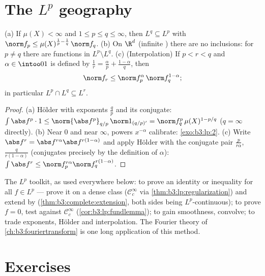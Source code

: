 \section{The \texorpdfstring{$L^p$}{Lp} geography}

\begin{proposition}\label{prop:b3:lp:inclusions}
(a) If $\mu(X) < \infty$ and $1 \leq p \leq q \leq \infty$,
then $L^q \subseteq L^p$ with $\norm f_p \leq
\mu(X)^{\frac1p - \frac1q}\,\norm f_q$.
(b) On $\R^d$ (infinite ) there are no inclusions:
for $p \neq q$ there are functions in $L^p\setminus L^q$.
(c) (Interpolation) If $p < r < q$ and $\alpha \in \intoo01$
is defined by $\frac1r = \frac\alpha p + \frac{1 - \alpha}q$,
then
\[
\norm f_r \leq \norm f_p^{\alpha}\,\norm f_q^{1 - \alpha} ;
\]
in particular $L^p \cap L^q \subseteq L^r$.
\end{proposition}

\begin{proof}
(a) H\"older with exponents $\frac qp$ and its conjugate:
$\int\abs f^p\cdot 1 \leq \norm{\abs f^p}_{q/p}\,\norm
1_{(q/p)'} = \norm f_q^p\,\mu(X)^{1 - p/q}$ ($q = \infty$
directly). (b) Near $0$ and near $\infty$, powers $x^{-\alpha}$
calibrate: \cref{exo:b3:lp:2}. (c) Write $\abs f^r = \abs
f^{r\alpha}\abs f^{r(1-\alpha)}$ and apply H\"older with the
conjugate pair $\frac p{r\alpha}$, $\frac q{r(1-\alpha)}$
(conjugates precisely by the definition of $\alpha$):
$\int\abs f^r \leq \norm f_p^{r\alpha}\norm f_q^{r(1 -
\alpha)}$.
\end{proof}

\begin{method}\label{met:b3:lp:toolkit}
The $L^p$ toolkit, as used everywhere below: to prove an
identity or inequality for all $f \in L^p$ --- prove it on a
dense class ($\mathcal C_c^\infty$ via
\cref{thm:b3:lp:regularization}) and extend by 
(\cref{thm:b3:complete:extension}, both sides being
$L^p$-continuous); to prove $f = 0$, test against $\mathcal
C_c^\infty$ (\cref{cor:b3:lp:fundlemma}); to gain smoothness,
convolve; to trade exponents, H\"older and interpolation. The
Fourier theory of \cref{ch:b3:fouriertransform} is one long
application of this method.
\end{method}

\section{Exercises}

